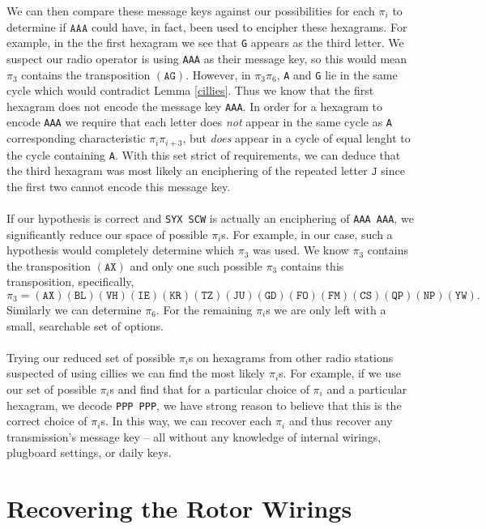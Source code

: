 \noindent We can then compare these message keys against our
possibilities for each
$\pi_i$ to determine if $\texttt{AAA}$ could have, in fact, been
used to encipher these hexagrams. For example, in the the first
hexagram we see that \texttt{G} appears as the third letter. We
suspect our radio operator is using \texttt{AAA} as their message
key, so this would mean $\pi_3$ contains the transposition
$(\texttt{AG})$. However, in $\pi_3\pi_6$, \texttt{A} and
\texttt{G} lie in the
same cycle which would contradict Lemma
\ref{cillies}. Thus we know that the first hexagram does not encode
the message key \texttt{AAA}. In order for a hexagram to encode
\texttt{AAA} we require that each letter does \emph{not} appear in
the same cycle as \texttt{A} corresponding characteristic
$\pi_i\pi_{i+3}$, but \emph{does} appear in a cycle of equal
lenght to the cycle containing \texttt{A}. With this set strict of
requirements, we can deduce that the
third hexagram was most likely an enciphering of the repeated letter
$\texttt{J}$ since the first two cannot encode this message key.
\\\\If our hypothesis is correct and \texttt{SYX SCW} is actually an
enciphering of \texttt{AAA AAA}, we significantly reduce our space of
possible $\pi_i$s. For example, in our case, such a
hypothesis would completely determine which $\pi_3$ was used. We
know $\pi_3$ contains the transposition $(\texttt{AX})$ and only
one such possible $\pi_3$ contains this transposition, specifically,
\[
  \pi_3 =
  (\texttt{AX})(\texttt{BL})(\texttt{VH})(\texttt{IE})(\texttt{KR})(\texttt{TZ})(\texttt{JU})(\texttt{GD})(\texttt{FO})(\texttt{FM})(\texttt{CS})(\texttt{QP})(\texttt{NP})(\texttt{YW}).
\]Similarly we can determine $\pi_6$.
For the remaining $\pi_i$s we are only left
with a small, searchable set of options.
\\\\Trying our reduced set of possible $\pi_i$s on hexagrams from
other radio stations
suspected of using cillies we can find the most likely $\pi_i$s.
For example, if we use our set of possible $\pi_i$s and find that
for a particular choice of $\pi_i$ and a particular hexagram, we
decode \texttt{PPP PPP}, we have strong reason to believe that this
is the correct choice of $\pi_i$s.
In this way, we can recover each $\pi_i$ and thus recover any
transmission's message key -- all without any knowledge of internal
wirings, plugboard settings, or daily keys.
\section{Recovering the Rotor Wirings}

